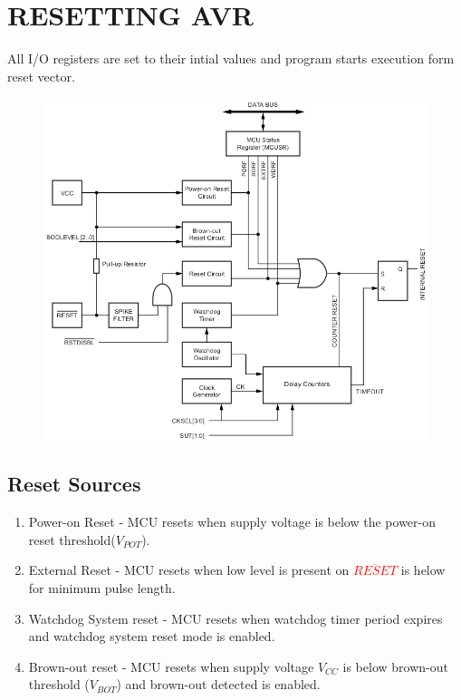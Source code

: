 \documentclass{article}
\newcommand{\pinFormat}[1]{\emph{\textcolor{red}{#1}}}
\begin{document}
\section{RESETTING AVR}
\quad All I/O registers are set to their intial values and program starts execution form reset vector.

\begin{figure}[H]
    \begin{center}
        \includegraphics[height=0.55\textheight]{resetLogic.png}
    \end{center}
\end{figure}

\subsection{Reset Sources}
\begin{enumerate}[label=(\Roman*)]
    \item Power-on Reset - MCU resets when supply voltage is below the power-on reset threshold($V_{POT}$).
    \item External Reset - MCU resets when low level is present on \pinFormat{$\overline{RESET}$} is helow for minimum pulse length.
    \item Watchdog System reset - MCU resets when watchdog timer period expires and watchdog system reset mode is enabled.
    \item Brown-out reset - MCU resets when supply voltage $V_{CC}$ is below brown-out threshold ($V_{BOT}$) and brown-out detected is enabled.
\end{enumerate}
\end{document}

